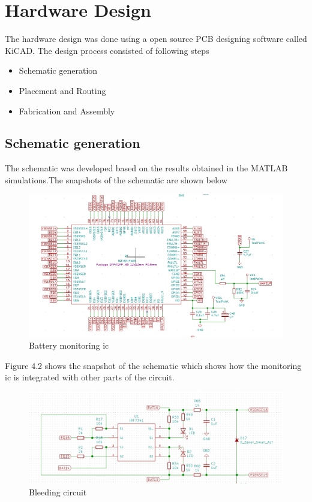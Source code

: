\section{Hardware Design}

The hardware design was done using a open source PCB designing software called KiCAD. The design process consisted of following steps

\begin{itemize}
    \item Schematic generation
    \item Placement and Routing 
    \item Fabrication and Assembly
\end{itemize}

\subsection{Schematic generation}
The schematic was developed based on the results obtained in the MATLAB simulations.The snapshots of the schematic are shown below
\begin{figure}[!h]
    \centering
    \includegraphics[scale=0.5]{Chapter4/Screenshot (53).png}
    \caption{Battery monitoring \acrshort{ic}}
\end{figure}

Figure 4.2 shows the snapshot of the schematic which shows how the monitoring \acrshort{ic} is integrated with other parts of the circuit.

\begin{figure}[H]
    \centering
    \includegraphics[scale=0.5]{Chapter4/Screenshot (55).png}
    \caption{Bleeding circuit}
\end{figure}

